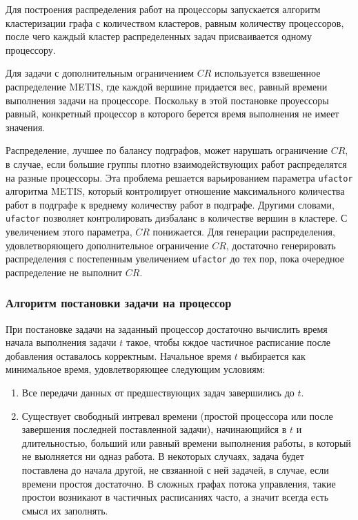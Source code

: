Для построения распределения работ на процессоры запускается алгоритм кластеризации графа с количеством кластеров, равным количеству процессоров, после чего каждый кластер распределенных задач присваивается одному процессору. 

Для задачи с дополнительным ограничением $CR$ используется взвешенное распределение METIS, где каждой вершине придается вес, равный времени выполнения задачи на процессоре. Поскольку в этой постановке проуессоры равный, конкретный процессор в которого берется время выполнения не имеет значения.

Распределение, лучшее по балансу подграфов, может нарушать ограничение $CR$, в случае, если большие группы плотно взаимодействующих работ распределятся на разные процессоры. Эта проблема решается варьированием параметра \texttt{ufactor} алгоритма METIS, который контролирует отношение максимального количества работ в подграфе к вреднему количеству работ в подграфе. Другими словами, \texttt{ufactor} позволяет контролировать дизбаланс в количестве вершин в кластере. С увеличением этого параметра, $CR$ понижается. Для генерации распределения, удовлетворяющего дополнительное ограничение $CR$, достаточно генерировать распределения с постепенным увеличением \texttt{ufactor} до тех пор, пока очередное распределение не выполнит $CR$.

\subsubsection{Алгоритм постановки задачи на процессор} \label{gap_filling}
При постановке задачи на заданный процессор достаточно вычислить время начала выполнения задачи $t$ такое, чтобы кждое частичное расписание после добавления оставалось корректным. Начальное время $t$ выбирается как минимальное время, удовлетворяющее следующим условиям:
\begin{enumerate}
    \item Все передачи данных от предшествующих задач завершились до $t$.
    \item Существует свободный интревал времени (простой процессора или после завершения последней поставленной задачи), начинающийся в $t$ и длительностью, больший или равный времени выполнения работы, в который не выолняется ни одназ работа. В некоторых случаях, задача будет поставлена до начала другой, не свзяанной с ней задачей, в случае, если времени простоя достаточно. В сложных графах потока управления, такие простои возникают в частичных расписаниях часто, а значит всегда есть смысл их заполнять.
\end{enumerate}

